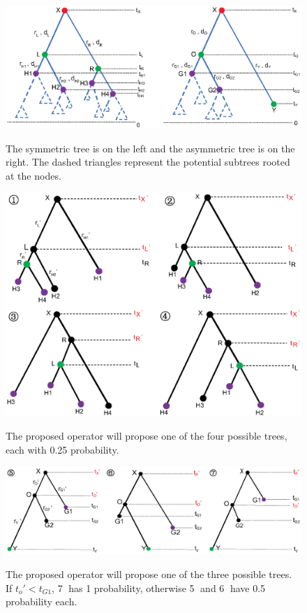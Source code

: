 \documentclass{bmcart}
\begin{document}
\begin{backmatter}
\begin{figure}[h!]
\includegraphics[width=12cm]{Fig05-treeshape.eps}\\
\caption{
             The symmetric tree is on the left and the asymmetric tree is on the right. The dashed triangles represent the potential subtrees rooted at the nodes.}
\label{treeshape}
\end{figure}

\begin{figure}[h!]
\includegraphics[width=12cm]{Fig06-symmetric.eps}\\
\caption{
             The proposed operator will propose one of the four possible trees, each with 0.25 probability.}
\label{symmetric}
\end{figure}

\begin{figure}[h!]
\includegraphics[width=12cm]{Fig07-asymmetric.eps}\\
\caption{
             The proposed operator will propose one of the three possible trees. If ${t_o}' < t_{G1}$, \textcircled7 has 1 probability, otherwise \textcircled5 and \textcircled6 have 0.5 probability each.}
\label{asymmetric}
\end{figure}


\end{backmatter}
\end{document}

